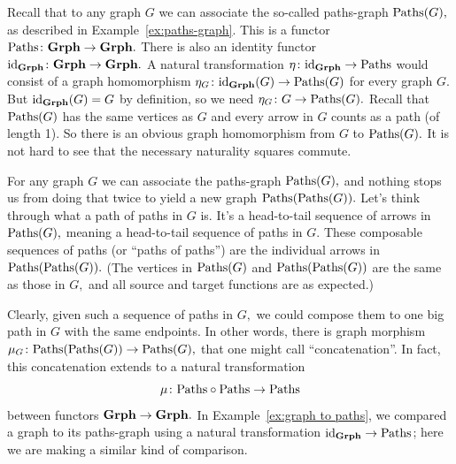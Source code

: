 \documentclass[CT4S-EN-RU]{subfiles}
\begin{document}
\begin{exampleRUS}
\end{exampleRUS}

\begin{exampleENG}\label{ex:graph to paths}
Recall that to any graph $G$ we can associate the so-called paths-graph $\textnormal{Paths}(G),$ as described in Example~\ref{ex:paths-graph}. This is a functor $\textnormal{Paths}\colon{\mathbf{Grph}}\rightarrow{\mathbf{Grph}}.$ There is also an identity functor $\textnormal{id}_{{\mathbf{Grph}}}\colon{\mathbf{Grph}}\rightarrow{\mathbf{Grph}}.$ A natural transformation $\eta\colon\textnormal{id}_{\mathbf{Grph}}\rightarrow\textnormal{Paths}$ would consist of a graph homomorphism $\eta_G\colon \textnormal{id}_{\mathbf{Grph}}(G)\rightarrow\textnormal{Paths}(G)$ for every graph $G.$ But $\textnormal{id}_{\mathbf{Grph}}(G)=G$ by definition, so we need $\eta_G\colon G\rightarrow\textnormal{Paths}(G).$ Recall that $\textnormal{Paths}(G)$ has the same vertices as $G$ and every arrow in $G$ counts as a path (of length 1). So there is an obvious graph homomorphism from $G$ to $\textnormal{Paths}(G).$ It is not hard to see that the necessary naturality squares commute.
\end{exampleENG}

\begin{exampleRUS}\label{ex:graph to paths}
\end{exampleRUS}

\begin{exampleENG}\label{ex:concat paths of paths}
For any graph $G$ we can associate the paths-graph $\textnormal{Paths}(G),$ and nothing stops us from doing that twice to yield a new graph $\textnormal{Paths}(\textnormal{Paths}(G)).$ Let's think through what a path of paths in $G$ is. It's a head-to-tail sequence of arrows in $\textnormal{Paths}(G),$ meaning a head-to-tail sequence of paths in $G.$ These composable sequences of paths (or “paths of paths”) are the individual arrows in $\textnormal{Paths}(\textnormal{Paths}(G)).$ (The vertices in $\textnormal{Paths}(G)$ and $\textnormal{Paths}(\textnormal{Paths}(G))$ are the same as those in $G,$ and all source and target functions are as expected.)

Clearly, given such a sequence of paths in $G,$ we could compose them to one big path in $G$ with the same endpoints. In other words, there is graph morphism $\mu_G\colon\textnormal{Paths}(\textnormal{Paths}(G))\rightarrow\textnormal{Paths}(G),$ that one might call “concatenation”. In fact, this concatenation extends to a natural transformation $$\mu\colon\textnormal{Paths}\circ\textnormal{Paths}\rightarrow\textnormal{Paths}$$ between functors ${\mathbf{Grph}}\rightarrow{\mathbf{Grph}}.$ In Example~\ref{ex:graph to paths}, we compared a graph to its paths-graph using a natural transformation $\textnormal{id}_{{\mathbf{Grph}}}\rightarrow\textnormal{Paths}$; here we are making a similar kind of comparison.
\end{exampleENG}
\end{document}
